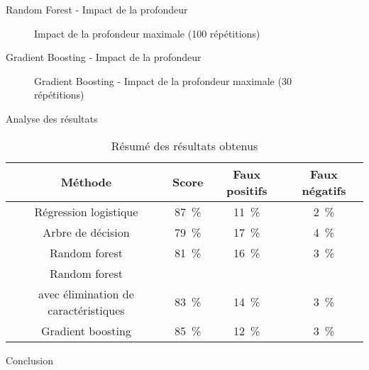 \documentclass{beamer}
\begin{document}
\begin{frame}{Random Forest - Impact de la profondeur}
	\begin{figure}
		\begin{center}
			\caption{Impact de la profondeur maximale (100 répétitions)}
			\label{rf_depth}
		\end{center}
	\end{figure}
\end{frame}

\begin{frame}{Gradient Boosting - Impact de la profondeur}
	\begin{figure}
		\begin{center}
			\caption{Gradient Boosting - Impact de la profondeur maximale (30 répétitions)}
			\label{gb_estimators}
		\end{center}
	\end{figure}
\end{frame}

\begin{frame}{Analyse des résultats}
\begin{table}
	\small
	\begin{center}
	\begin{tabular}{cccc}
		\toprule
		Méthode  &	Score  &	Faux positifs  &	Faux négatifs \\
		\midrule
		Régression logistique 	& \SI{87}{\percent} 	 &	\SI{11}{\percent}  	& \SI{2}{\percent} \\
		Arbre de décision & \SI{79}{\percent} & \SI{17}{\percent} & \SI{4}{\percent} \\
		Random forest & \SI{81}{\percent} & \SI{16}{\percent} & \SI{3}{\percent} \\
		Random forest \\ avec élimination de caractéristiques& \SI{83}{\percent} & \SI{14}{\percent} & \SI{3}{\percent} \\
		Gradient boosting & \SI{85}{\percent} & \SI{12}{\percent} & \SI{3}{\percent} \\
		\bottomrule
	\end{tabular}
	\caption{Résumé des résultats obtenus \label{table:results}}
	\end{center}
\end{table}

\end{frame}

\begin{frame}{Conclusion}
\end{frame}
\end{document}
